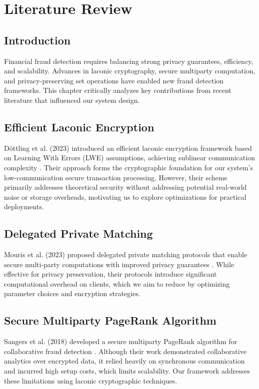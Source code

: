 \chapter{Literature Review}

\section{Introduction}

Financial fraud detection requires balancing strong privacy guarantees, efficiency, and scalability. Advances in laconic cryptography, secure multiparty computation, and privacy-preserving set operations have enabled new fraud detection frameworks. This chapter critically analyzes key contributions from recent literature that influenced our system design.

\section{Efficient Laconic Encryption}

Döttling et al. (2023) introduced an efficient laconic encryption framework based on Learning With Errors (LWE) assumptions, achieving sublinear communication complexity \cite{cryptoeprint:2023/404}.  
Their approach forms the cryptographic foundation for our system's low-communication secure transaction processing.  
However, their scheme primarily addresses theoretical security without addressing potential real-world noise or storage overheads, motivating us to explore optimizations for practical deployments.

\section{Delegated Private Matching}

Mouris et al. (2023) proposed delegated private matching protocols that enable secure multi-party computations with improved privacy guarantees \cite{cryptoeprint:2023/012}.  
While effective for privacy preservation, their protocols introduce significant computational overhead on clients, which we aim to reduce by optimizing parameter choices and encryption strategies.

\section{Secure Multiparty PageRank Algorithm}

Sangers et al. (2018) developed a secure multiparty PageRank algorithm for collaborative fraud detection \cite{cryptoeprint:2018/917}.  
Although their work demonstrated collaborative analytics over encrypted data, it relied heavily on synchronous communication and incurred high setup costs, which limits scalability. Our framework addresses these limitations using laconic cryptographic techniques.

